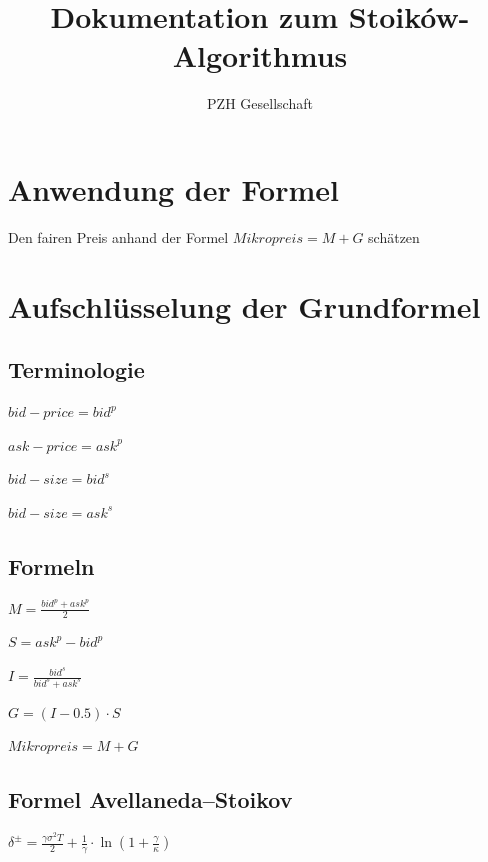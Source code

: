 \documentclass[11pt]{article}
\begin{document}
\title{Dokumentation zum Stoików-Algorithmus}
\author{PZH Gesellschaft}
\maketitle


\section{Anwendung der Formel}

Den fairen Preis anhand der Formel $Mikropreis = M + G$ schätzen

\section{Aufschlüsselung der Grundformel}

\subsection{Terminologie}

$bid-price = bid^p$

$ask-price = ask^p$

$bid-size  = bid^s$

$bid-size  = ask^s$

\subsection{Formeln}

$M = \frac{bid^p + ask^p}{2}$

$S = ask^p - bid^p$

$I = \frac{bid^s}{bid^s + ask^s}$

$G = \left(I - 0.5\right) \cdot S$

$Mikropreis = M + G$

\subsection{Formel Avellaneda–Stoikov}

$\delta^{\pm} = \frac{\gamma \sigma^2 T}{2} + \frac{1}{\gamma} \cdot \ln\left(1 + \frac{\gamma}{\kappa}\right)$
\end{document}
